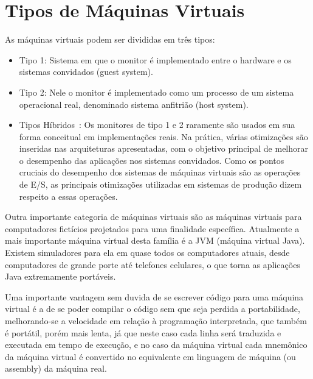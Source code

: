     
\section{Tipos de Máquinas Virtuais}
As máquinas virtuais podem ser divididas em três tipos:
\begin{itemize}
 \item   Tipo 1: Sistema em que o monitor é implementado entre o hardware e os sistemas convidados (guest system).
  \item  Tipo 2: Nele o monitor é implementado como um processo de um sistema operacional real, denominado sistema anfitrião (host system).
   \item Tipos Híbridos~\cite{nemeth}: Os monitores de tipo 1 e 2 raramente são usados em sua forma conceitual em implementações reais. Na prática, várias otimizações são inseridas nas arquiteturas apresentadas, com o objetivo principal de melhorar o desempenho das aplicações nos sistemas convidados. Como os pontos cruciais do desempenho dos sistemas de máquinas virtuais são as operações de E/S, as principais otimizações utilizadas em sistemas de produção dizem respeito a essas operações.
\end{itemize}
Outra importante categoria de máquinas virtuais são as máquinas virtuais para computadores fictícios projetados para uma finalidade específica. Atualmente a mais importante máquina virtual desta família é a JVM (máquina virtual Java). Existem simuladores para ela em quase todos os computadores atuais, desde computadores de grande porte até telefones celulares, o que torna as aplicações Java extremamente portáveis.

Uma importante vantagem sem duvida de se escrever código para uma máquina virtual é a de se poder compilar o código sem que seja perdida a portabilidade, melhorando-se a velocidade em relação à programação interpretada, que também é portátil, porém mais lenta, já que neste caso cada linha será traduzida e executada em tempo de execução, e no caso da máquina virtual cada mnemônico da máquina virtual é convertido no equivalente em linguagem de máquina (ou assembly) da máquina real.


